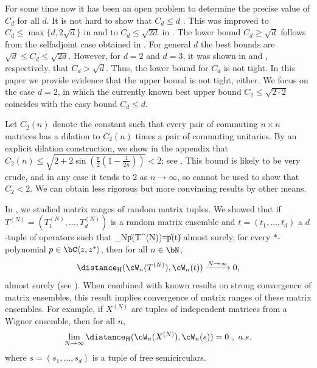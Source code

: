 For some time now it has been an open problem to determine the precise value of $C_d$ for all $d$. 
It is not hard to show that $C_d \leq d$ \cite{DDSS17, HKMS19}. 
This was improved to $C_d \leq \max\{d, 2 \sqrt{d}\}$ in \cite{PSS18} and to $C_d \leq \sqrt{2d}$ in \cite{Pas19}. 
The lower bound $C_d \geq \sqrt{d}$ follows from the selfadjoint case obtained in \cite{PSS18}. 
For general $d$ the best bounds are $\sqrt{d} \leq C_d \leq \sqrt{2d}$. 
However, for $d = 2$ and $d = 3$, it was shown in \cite{GSh20} and \cite{GPSS21}, respectively, that $C_d > \sqrt{d}$. 
Thus, the lower bound for $C_d$ is not tight. In this paper we provide evidence that the upper bound is not tight, either.
We focus on the case $d = 2$, in which the currently known best upper bound $C_2 \leq \sqrt{2 \cdot 2}$ coincides with the easy bound $C_d \leq d$. 

Let $C_2(n)$ denote the constant such that every pair of commuting $n \times n$ matrices has a dilation to $C_2(n)$ times a pair of commuting unitaries. 
By an explicit dilation construction, we show in the appendix that $C_2(n)\le\sqrt{2+2\sin(\tfrac{\pi}{2}(1-\tfrac{1}{2n}))} < 2$; see . This bound is likely to be very crude, and in any case it tends to $2$ as $n \to \infty$, so cannot be used to show that $C_2 < 2$. 
We can obtain less rigorous but more convincing results by other means. 


In \cite{GSh21}, we studied matrix ranges of random matrix tuples. 
We showed that if $T^{(N)} = (T_1^{(N)}, \ldots, T_d^{(N)})$ is a random matrix ensemble and $t = (t_1, \ldots, t_d)$ a $d$-tuple of operators such that
\be\label{eq:SAF}
\lim_{N\to\infty}\|p(T^{(N)})\|=\|p(t)\|
\ee
almost surely, for every $*$-polynomial $p \in \bC\langle z, z^* \rangle$, then for all $n \in \bN$, 
\[
\distance_{\mathrm H}(\cW_n(T^{(N)}),\cW_n(t)) \xrightarrow{N \to \infty} 0,
\]
almost surely (see \cite[Theorem 3.1]{GSh21}). When combined with known results on strong convergence of matrix ensembles, this result implies convergence of matrix ranges of these matrix ensembles. For example, if $X^{(N)}$ are tuples of independent matrices from a Wigner ensemble, then for all $n$,
\[
\lim_{N \to \infty} \distance_{\mathrm H}(\cW_n(X^{(N)}),\cW_n(s)) = 0 \,\, , \,\, a.s.
\]
where $s = (s_1, \ldots, s_d)$ is a tuple of free semicirculars. 

